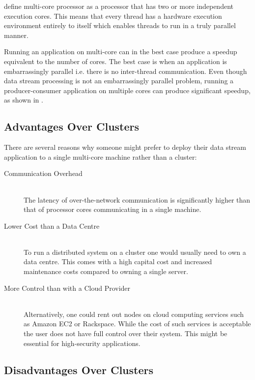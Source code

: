 \documentclass[bsc,twoside,singlespacing,normalheadings,parskip]{infthesis}\usepackage[]{graphicx}\usepackage[]{color}
\let\Oldtodo\todo
\renewcommand{\todo}[1]{\Oldtodo[inline]{#1}}
\begin{document}
\textcite{akhter2006multi} define multi-core processor as a processor that has two or more independent execution cores. This means that every thread has a hardware execution environment entirely to itself which enables threads to run in a truly parallel manner.

Running an application on multi-core can in the best case produce a speedup equivalent to the number of cores. The best case is when an application is embarrassingly parallel i.e. there is no inter-thread communication. Even though data stream processing is not an embarrassingly parallel problem, running a producer-consumer application on multiple cores can produce significant speedup, as shown in  \citep{Prat-Perez:2013:PPM:2450027.2450037}.

\todo{what was the speedup?}

\subsection{Advantages Over Clusters}
\label{subsec:advantages}

There are several reasons why someone might prefer to deploy their data stream application to a single multi-core machine rather than a cluster:

\begin{description}
	\item[Communication Overhead] \hfill \\
	The latency of over-the-network communication is significantly higher than that of processor cores communicating in a single machine.
	\item[Lower Cost than a Data Centre] \hfill \\
	To run a distributed system on a cluster one would usually need to own a data centre. This comes with a high capital cost and increased maintenance costs compared to owning a single server.
	\item[More Control than with a Cloud Provider] \hfill \\
	Alternatively, one could rent out nodes on cloud computing services such as Amazon EC2 or Rackspace. While the cost of such services is acceptable the user does not have full control over their system. This might be essential for high-security applications.
\end{description}

\subsection{Disadvantages Over Clusters}
\label{subsec:disadvantages}
\end{document}
